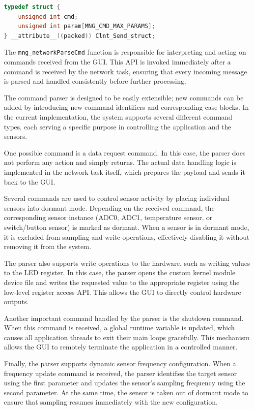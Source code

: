 \begin{lstlisting}[language=C,
caption={Send Command Structure},
label={lst:Clnt_Send_struct}]
typedef struct {
    unsigned int cmd;                   
    unsigned int param[MNG_CMD_MAX_PARAMS];     
} __attribute__((packed)) Clnt_Send_struct;
\end{lstlisting}


The \texttt{mng\_networkParseCmd} function is responsible for interpreting and acting on commands received from the GUI. This API is invoked immediately after a command is received by the network task, ensuring that every incoming message is parsed and handled consistently before further processing.

The command parser is designed to be easily extensible; new commands can be added by introducing new command identifiers and corresponding case blocks. In the current implementation, the system supports several different command types, each serving a specific purpose in controlling the application and the sensors.

One possible command is a data request command. In this case, the parser does not perform any action and simply returns. The actual data handling logic is implemented in the network task itself, which prepares the payload and sends it back to the GUI.

Several commands are used to control sensor activity by placing individual sensors into dormant mode. Depending on the received command, the corresponding sensor instance (ADC0, ADC1, temperature sensor, or switch/button sensor) is marked as dormant. When a sensor is in dormant mode, it is excluded from sampling and write operations, effectively disabling it without removing it from the system.

The parser also supports write operations to the hardware, such as writing values to the LED register. In this case, the parser opens the custom kernel module device file and writes the requested value to the appropriate register using the low-level register access API. This allows the GUI to directly control hardware outputs.

Another important command handled by the parser is the shutdown command. When this command is received, a global runtime variable is updated, which causes all application threads to exit their main loops gracefully. This mechanism allows the GUI to remotely terminate the application in a controlled manner.

Finally, the parser supports dynamic sensor frequency configuration. When a frequency update command is received, the parser identifies the target sensor using the first parameter and updates the sensor’s sampling frequency using the second parameter. At the same time, the sensor is taken out of dormant mode to ensure that sampling resumes immediately with the new configuration.

